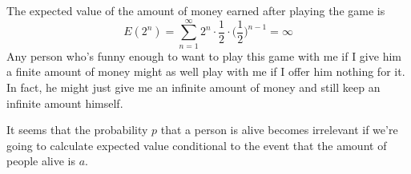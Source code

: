 \documentclass{article}
\begin{document}
\begin{ex}
The expected value of the amount of money earned after playing the game is
\begin{equation*}
E(2^n) = \sum_{n=1}^\infty 2^n\cdot\frac{1}{2}\cdot\Big(\frac{1}{2}\Big)^{n-1}=\infty
\end{equation*}
Any person who's funny enough to want to play this game with me if I give him a finite amount of money might as well play with me if I offer him nothing for it. In fact, he might just give me an infinite amount of money and still keep an infinite amount himself.
\end{ex}

\begin{ex}
It seems that the probability $p$ that a person is alive becomes irrelevant if we're going to calculate expected value conditional to the event that the amount of people alive is $a$. 


\end{ex}
\end{document}
